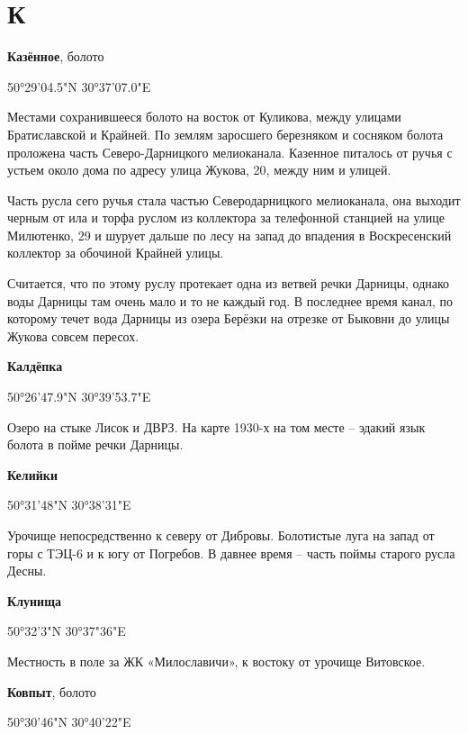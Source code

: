 \chapter*{К}

\textbf{Казённое}, болото

50°29'04.5"N 30°37'07.0"E

Местами сохранившееся болото на восток от Куликова, между улицами Братиславской и Крайней. По землям заросшего березняком и сосняком болота проложена часть Северо-Дарницкого мелиоканала. Казенное питалось от ручья с устьем около дома по адресу улица Жукова, 20, между ним и улицей. 

Часть русла сего ручья стала частью Северодарницкого мелиоканала, она выходит черным от ила и торфа руслом из коллектора за телефонной станцией на улице Милютенко, 29 и шурует дальше по лесу на запад до впадения в Воскресенский коллектор за обочиной Крайней улицы.

Считается, что по этому руслу протекает одна из ветвей речки Дарницы, однако воды Дарницы там очень мало и то не каждый год. В последнее время канал, по которому течет вода Дарницы из озера Берёзки на отрезке от Быковни до улицы Жукова совсем пересох.\\

\medskip


\textbf{Калдёпка}

50°26'47.9"N 30°39'53.7"E

Озеро на стыке Лисок и ДВРЗ. На карте 1930-х на том месте – эдакий язык болота в пойме речки Дарницы.\\

\medskip


\textbf{Келийки}

50°31'48"N 30°38'31"E

Урочище непосредственно к северу от Дибровы. Болотистые луга на запад от горы с ТЭЦ-6 и к югу от Погребов. В давнее время – часть поймы старого русла Десны.\\

\medskip


\textbf{Клунища}

50°32'3"N 30°37"36"E

Местность в поле за ЖК «Милославичи», к востоку от урочище Витовское.\\

\medskip


\textbf{Ковпыт}, болото

50°30'46"N 30°40'22"E

